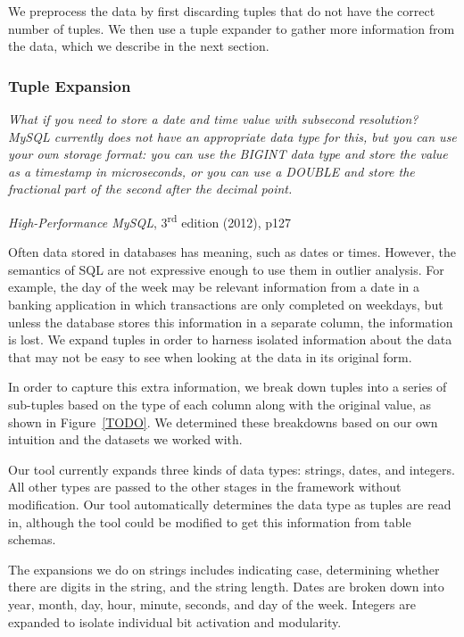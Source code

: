 
We preprocess the data by first discarding tuples that do not have the correct number of tuples.
We then use a tuple expander to gather more information from the data, which we describe in the next section.

\subsubsection{Tuple Expansion}

\noindent\begin{minipage}{0.8\linewidth}
  \itshape
  What if you need to store a date and time value with subsecond resolution? MySQL
  currently does not have an appropriate data type for this, but you can use your own
  storage format: you can use the BIGINT data type and store the value as a timestamp in
  microseconds, or you can use a DOUBLE and store the fractional part of the second after
  the decimal point.
\end{minipage}
\begin{flushright}
  \textit{High-Performance MySQL}, 3\textsuperscript{rd} edition (2012), p127
\end{flushright}

Often data stored in databases has meaning, such as dates or times.
However, the semantics of SQL are not expressive enough to use them in outlier analysis.
For example, the day of the week may be relevant information from a date in a banking application in which transactions are only completed on weekdays, but unless the database stores this information in a separate column, the information is lost.
We expand tuples in order to harness isolated information about the data that may not be easy to see when looking at the data in its original form.

In order to capture this extra information, we break down tuples into a series of sub-tuples based on the type of each column along with the original value, as shown in Figure~\ref{TODO}.
We determined these breakdowns based on our own intuition and the datasets we worked with.

Our tool currently expands three kinds of data types: strings, dates, and integers.
All other types are passed to the other stages in the framework without modification.
Our tool automatically determines the data type as tuples are read in, although the tool could be modified to get this information from table schemas.

The expansions we do on strings includes indicating case, determining whether there are digits in the string, and the string length.
Dates are broken down into year, month, day, hour, minute, seconds, and day of the week.
Integers are expanded to isolate individual bit activation and modularity.

